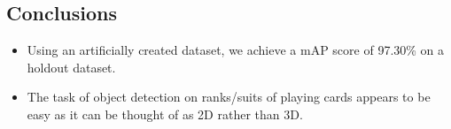 \documentclass[a0,landscape]{a0poster}
\begin{document}
\begin{multicols}{3}

\begin{center}
\section*{Conclusions}

\begin{itemize}
\item Using an artificially created dataset, we achieve a mAP score of 97.30\% on a holdout dataset.
\item The task of object detection on ranks/suits of playing cards appears to be easy as it can be thought of as 2D rather than 3D.

\end{itemize}
  \end{center}
\color{DarkSlateGray} %


\nocite{*} %



\end{multicols}
\end{document}
